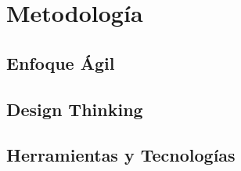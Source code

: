 \chapter{Metodología}

\section{Enfoque Ágil}

\section{Design Thinking}

\section{Herramientas y Tecnologías}
